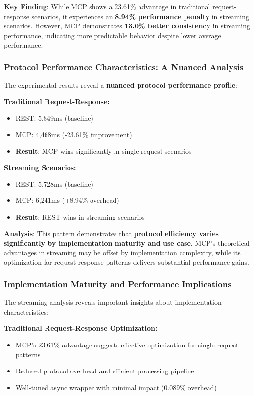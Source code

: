 \textbf{Key Finding}: While MCP shows a 23.61\% advantage in traditional request-response scenarios, it experiences an \textbf{8.94\% performance penalty} in streaming scenarios. However, MCP demonstrates \textbf{13.0\% better consistency} in streaming performance, indicating more predictable behavior despite lower average performance.

\subsubsection{Protocol Performance Characteristics: A Nuanced Analysis}

The experimental results reveal a \textbf{nuanced protocol performance profile}:

\textbf{Traditional Request-Response:}
\begin{itemize}
    \item REST: 5,849ms (baseline)
    \item MCP: 4,468ms (-23.61\% improvement)
    \item \textbf{Result}: MCP wins significantly in single-request scenarios
\end{itemize}

\textbf{Streaming Scenarios:}
\begin{itemize}
    \item REST: 5,728ms (baseline)
    \item MCP: 6,241ms (+8.94\% overhead)
    \item \textbf{Result}: REST wins in streaming scenarios
\end{itemize}

\textbf{Analysis}: This pattern demonstrates that \textbf{protocol efficiency varies significantly by implementation maturity and use case}. MCP's theoretical advantages in streaming may be offset by implementation complexity, while its optimization for request-response patterns delivers substantial performance gains.

\subsubsection{Implementation Maturity and Performance Implications}

The streaming analysis reveals important insights about implementation characteristics:

\textbf{Traditional Request-Response Optimization:}
\begin{itemize}
    \item MCP's 23.61\% advantage suggests effective optimization for single-request patterns
    \item Reduced protocol overhead and efficient processing pipeline
    \item Well-tuned async wrapper with minimal impact (0.089\% overhead)
\end{itemize}

